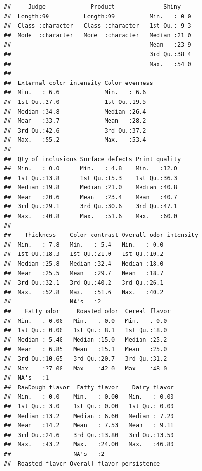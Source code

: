 \documentclass[
]{krantz}
\begin{document}
\begin{verbatim}
##     Judge             Product              Shiny     
##  Length:99          Length:99          Min.   : 0.0  
##  Class :character   Class :character   1st Qu.: 9.3  
##  Mode  :character   Mode  :character   Median :21.0  
##                                        Mean   :23.9  
##                                        3rd Qu.:38.4  
##                                        Max.   :54.0  
##                                                      
##  External color intensity Color evenness
##  Min.   : 6.6             Min.   : 6.6  
##  1st Qu.:27.0             1st Qu.:19.5  
##  Median :34.8             Median :26.4  
##  Mean   :33.7             Mean   :28.2  
##  3rd Qu.:42.6             3rd Qu.:37.2  
##  Max.   :55.2             Max.   :53.4  
##                                         
##  Qty of inclusions Surface defects Print quality 
##  Min.   : 0.0      Min.   : 4.8    Min.   :12.0  
##  1st Qu.:13.8      1st Qu.:15.3    1st Qu.:36.3  
##  Median :19.8      Median :21.0    Median :40.8  
##  Mean   :20.6      Mean   :23.4    Mean   :40.7  
##  3rd Qu.:29.1      3rd Qu.:30.6    3rd Qu.:47.1  
##  Max.   :40.8      Max.   :51.6    Max.   :60.0  
##                                                  
##    Thickness    Color contrast Overall odor intensity
##  Min.   : 7.8   Min.   : 5.4   Min.   : 0.0          
##  1st Qu.:18.3   1st Qu.:21.0   1st Qu.:10.2          
##  Median :25.8   Median :32.4   Median :18.0          
##  Mean   :25.5   Mean   :29.7   Mean   :18.7          
##  3rd Qu.:32.1   3rd Qu.:40.2   3rd Qu.:26.1          
##  Max.   :52.8   Max.   :51.6   Max.   :40.2          
##                 NA's   :2                            
##    Fatty odor     Roasted odor  Cereal flavor 
##  Min.   : 0.00   Min.   : 0.0   Min.   : 0.0  
##  1st Qu.: 0.00   1st Qu.: 8.1   1st Qu.:18.0  
##  Median : 5.40   Median :15.0   Median :25.2  
##  Mean   : 6.85   Mean   :15.1   Mean   :25.0  
##  3rd Qu.:10.65   3rd Qu.:20.7   3rd Qu.:31.2  
##  Max.   :27.00   Max.   :42.0   Max.   :48.0  
##  NA's   :1                                    
##  RawDough flavor  Fatty flavor    Dairy flavor  
##  Min.   : 0.0    Min.   : 0.00   Min.   : 0.00  
##  1st Qu.: 3.0    1st Qu.: 0.00   1st Qu.: 0.00  
##  Median :13.2    Median : 6.60   Median : 7.20  
##  Mean   :14.2    Mean   : 7.53   Mean   : 9.11  
##  3rd Qu.:24.6    3rd Qu.:13.80   3rd Qu.:13.50  
##  Max.   :43.2    Max.   :24.00   Max.   :46.80  
##                  NA's   :2                      
##  Roasted flavor Overall flavor persistence

\end{verbatim}
\end{document}
